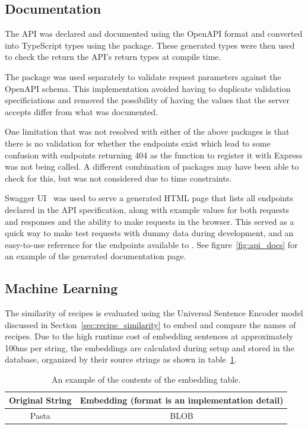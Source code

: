 \subsection{Documentation}
The API was declared and documented using the OpenAPI format and converted
into TypeScript types using the  package. These
generated types were then used to check the return the API's return types at compile time.

The  package was used separately to validate
request parameters against the OpenAPI schema. This implementation avoided having
to duplicate validation specificiations and removed the possibility of having the values that
the server accepts differ from what was documented.

One limitation that was not resolved with either of the above packages is that there is no validation
for whether the endpoints exist which lead to some confusion with endpoints returning 404 as the function to
register it with Express was not being called. A different combination of packages may have been able to check for this,
but was not considered due to time constraints.

Swagger UI~\cite{smartbear_swagger_2024} was used to serve a generated HTML page that lists all endpoints declared in
the API specification, along with example values for both requests and responses and the ability to make requests in
the browser. This served as a quick way to make test requests with dummy data during development, and an easy-to-use
reference for the endpoints available to . See figure~\ref{fig:api_docs} for an example of the
generated documentation page.

\subsection{Machine Learning}
The similarity of recipes is evaluated using the Universal Sentence Encoder model discussed in Section~\ref{sec:recipe_similarity} to
embed and compare the names of recipes. Due to the high runtime cost of embedding sentences at approximately 100ms per string,
the embeddings are calculated during setup and stored in the database, organized by their source strings as shown in table~\ref{fig:embedding_table}.

\begin{table}[h]
    \centering
    \caption{\label{fig:embedding_table}An example of the contents of the embedding table.}
    \begin{tabular}{cc}
        \toprule
        \textbf{Original String} & \textbf{Embedding (format is an implementation detail)} \\\midrule
        Pasta & BLOB \\\bottomrule
    \end{tabular}
\end{table}

